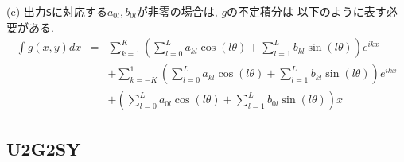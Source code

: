 \documentclass[a4j,fleqn]{jarticle}
\begin{document}
\begin{enumerate}
(c) 出力{\tt S}に対応する$a_{0l},b_{0l}$が非零の場合は, $g$の不定積分は
 以下のように表す必要がある.
\begin{eqnarray*}
\int g(x,y) dx
&=&\sum^K_{k=1}\left(\sum^L_{l=0}a_{kl}\cos(l\theta)
+\sum^L_{l=1}b_{kl}\sin(l\theta)\right)
e^{ikx}\\
& &+\sum^1_{k=-K}\left(\sum^L_{l=0}a_{kl}\cos(l\theta)
+\sum^L_{l=1}b_{kl}\sin(l\theta)\right)
e^{ikx}\\
& &+\left(\sum^L_{l=0}a_{0l}\cos(l\theta)
+\sum^L_{l=1}b_{0l}\sin(l\theta)\right)x
\end{eqnarray*}

\end{enumerate}


\subsection{U2G2SY}
\end{document}
